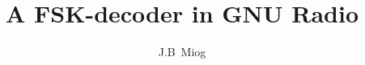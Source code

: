 \documentclass[whitelogo]{tudelft-report}
\begin{document}
\frontmatter


\title[tudelft-white]{A FSK-decoder in GNU Radio}
\subtitle[tudelft-black]{}
\author[tudelft-white]{J.B\ Miog}
\makecover[split]



%

\tableofcontents

\mainmatter


 

\appendix

%


\end{document}
